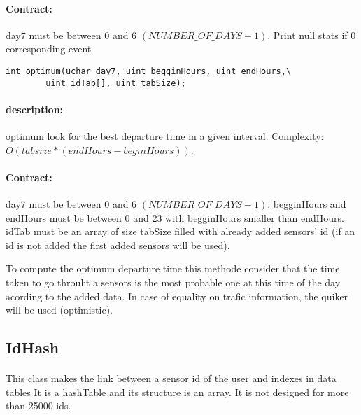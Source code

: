 \documentclass[a4paper, 12pts]{article}
\begin{document}
\paragraph{Contract:}
	day7 must be between 0 and 6 $(NUMBER\_OF\_DAYS-1)$. Print null stats if 0 corresponding event
		
\begin{lstlisting}
int optimum(uchar day7, uint begginHours, uint endHours,\
		uint idTab[], uint tabSize);
\end{lstlisting}
\paragraph{description:}
	optimum look for the best departure time in a given interval. Complexity: $O(tabsize * (endHours-beginHours) )$.
\paragraph{Contract:}
	day7 must be between 0 and 6 $(NUMBER\_OF\_DAYS-1)$. begginHours and endHours must be between 0 and 23 with begginHours smaller than endHours. idTab must be an array of size tabSize filled with already added sensors' id (if an id is not added the first added sensors will be used).
	
	To compute the optimum departure time this methode consider that the time taken to go throuht a sensors is the most probable one at this time of the day acording to the added data. In case of equality on trafic information, the quiker will be used (optimistic).

\subsection{IdHash}

\paragraph{}
This class makes the link between a sensor id of the user and indexes in data tables
It is a hashTable and its structure is an array.
It is not designed for more than 25000 ids.

\end{document}
